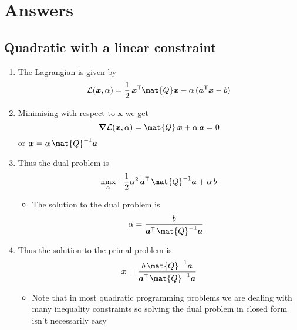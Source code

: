 \documentclass[11pt]{article}
\newcommand{\tr}{\textsf{T}}
\newcommand{\grad}{\bm{\nabla}}
\begin{document}
\section{Answers}
\label{sec:org39143c8}

\subsection{Quadratic with a linear constraint}
\label{sec:org7e9dd34}
\begin{enumerate}
\item The Lagrangian is given by
$$ \mathcal{L}(\bm{x},\alpha) = \frac{1}{2}\, \bm{x}^\tr \mat{Q}
      \bm{x} - \alpha \,(\bm{a}^\tr\bm{x} - b) $$
\item Minimising with respect to \(\bm{x}\) we get
$$ \grad  \mathcal{L}(\bm{x},\alpha) =  \mat{Q}\,  \bm{x} + \alpha\,
      \bm{a} = 0 $$
or \(\bm{x} = \alpha\, \mat{Q}^{-1} \bm{a}\)
\item Thus the dual problem is
$$ \max_\alpha - \frac{1}{2} \alpha^2 \, \bm{a}^\tr\, \mat{Q}^{-1}\bm{a} + \alpha\,b $$
\begin{itemize}
\item The solution to the dual problem is
$$ \alpha = \frac{b}{\bm{a}^\tr\, \mat{Q}^{-1}\bm{a}} $$
\end{itemize}
\item Thus the solution to the primal problem is
$$ \bm{x} = \frac{b\, \mat{Q}^{-1} \bm{a}}{\bm{a}^\tr\,
      \mat{Q}^{-1}\bm{a}} $$
\begin{itemize}
\item Note that in most quadratic programming problems we are dealing
with many inequality constraints so solving the dual problem in
closed form isn't necessarily easy
\end{itemize}
\end{enumerate}
\end{document}
